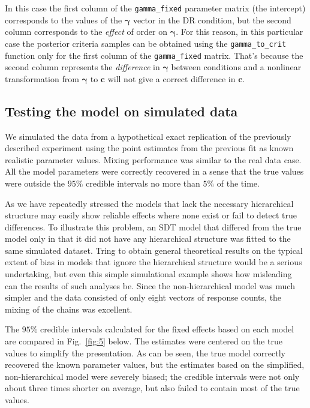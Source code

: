 \documentclass[a4paper,man,apacite,floatsintext]{apa6}
\newcommand{\code}[1]{\texttt{#1}}
\begin{document}
In this case the first column of the \code{gamma\_fixed} parameter
matrix (the intercept) corresponds to the values of the $\bm{\gamma}$
vector in the DR condition, but the second column corresponds to the
\emph{effect} of order on $\bm{\gamma}$. For this reason, in this
particular case the posterior criteria samples can be obtained using
the \code{gamma\_to\_crit} function only for the first column of the
\code{gamma\_fixed} matrix. That's because the second column
represents the \emph{difference} in $\bm{\gamma}$ between conditions
and a nonlinear transformation from $\bm{\gamma}$ to $\bm{c}$ will not
give a correct difference in $\bm{c}$.

\subsection{Testing the model on simulated data}

We simulated the data from a hypothetical exact replication of the
previously described experiment using the point estimates from the
previous fit as known realistic parameter values. Mixing performance
was similar to the real data case. All the model parameters were
correctly recovered in a sense that the true values were outside the
$95\%$ credible intervals no more than $5\%$ of the time.

As we have repeatedly stressed the models that lack the necessary
hierarchical structure may easily show reliable effects where none
exist or fail to detect true differences. To illustrate this problem,
an SDT model that differed from the true model only in that it did not
have any hierarchical structure was fitted to the same simulated
dataset. Tring to obtain general theoretical results on the typical
extent of bias in models that ignore the hierarchical structure would
be a serious undertaking, but even this simple simulational example
shows how misleading can the results of such analyses be. Since the
non-hierarchical model was much simpler and the data consisted of only
eight vectors of response counts, the mixing of the chains was
excellent.

The $95\%$ credible intervals calculated for the fixed effects based
on each model are compared in Fig.~\ref{fig:5} below. The estimates
were centered on the true values to simplify the presentation. As can
be seen, the true model correctly recovered the known parameter
values, but the estimates based on the simplified, non-hierarchical
model were severely biased; the credible intervals were not only about
three times shorter on average, but also failed to contain most of the
true values.
\end{document}
